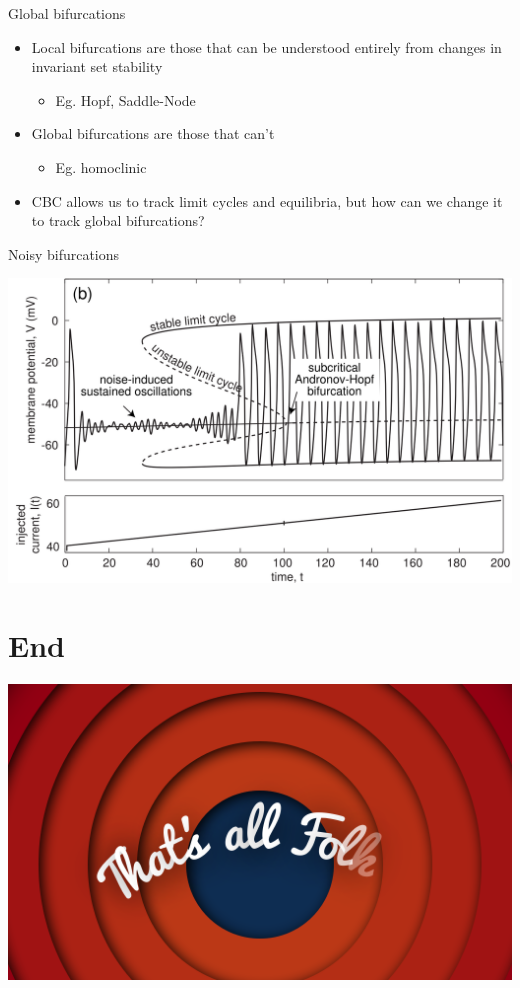 \documentclass[presentation]{beamer}
\begin{document}
\begin{frame}[label={sec:orgf19a748}]{Global bifurcations}
\begin{itemize}
\item Local bifurcations are those that can be understood entirely from changes in invariant set stability
\begin{itemize}
\item Eg. Hopf, Saddle-Node
\end{itemize}
\item Global bifurcations are those that can't
\begin{itemize}
\item Eg. homoclinic
\end{itemize}
\item CBC allows us to track limit cycles and equilibria, but how can we change it to track global bifurcations?
\end{itemize}
\end{frame}


\begin{frame}[label={sec:orgc2ed4d9}]{Noisy bifurcations}
\begin{center}
\includegraphics[height=.87\textheight]{./noise.png}
\end{center}
\end{frame}


\section{End}
\label{sec:org920a4ac}
\begin{frame}[plain,label={sec:orgcf30e38}]{}
\begin{center}
\includegraphics[width=.9\linewidth]{./end.png}
\end{center}
\end{frame}
\end{document}
